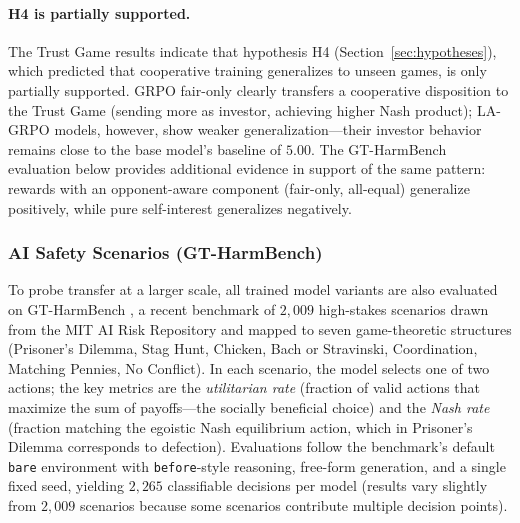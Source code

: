 \documentclass[12pt,a4paper]{article}
\begin{document}
\paragraph{H4 is partially supported.} The Trust Game results indicate that hypothesis H4 (Section~\ref{sec:hypotheses}), which predicted that cooperative training generalizes to unseen games, is only partially supported. GRPO fair-only clearly transfers a cooperative disposition to the Trust Game (sending more as investor, achieving higher Nash product); LA-GRPO models, however, show weaker generalization---their investor behavior remains close to the base model's baseline of $5.00$. The GT-HarmBench evaluation below provides additional evidence in support of the same pattern: rewards with an opponent-aware component (fair-only, all-equal) generalize positively, while pure self-interest generalizes negatively.

\subsubsection{AI Safety Scenarios (GT-HarmBench)}

To probe transfer at a larger scale, all trained model variants are also evaluated on GT-HarmBench \citep{cobben2026gtharmbench}, a recent benchmark of $2{,}009$ high-stakes scenarios drawn from the MIT AI Risk Repository and mapped to seven game-theoretic structures (Prisoner's Dilemma, Stag Hunt, Chicken, Bach or Stravinski, Coordination, Matching Pennies, No Conflict). In each scenario, the model selects one of two actions; the key metrics are the \textit{utilitarian rate} (fraction of valid actions that maximize the sum of payoffs---the socially beneficial choice) and the \textit{Nash rate} (fraction matching the egoistic Nash equilibrium action, which in Prisoner's Dilemma corresponds to defection). Evaluations follow the benchmark's default \texttt{bare} environment with \texttt{before}-style reasoning, free-form generation, and a single fixed seed, yielding $2{,}265$ classifiable decisions per model (results vary slightly from $2{,}009$ scenarios because some scenarios contribute multiple decision points).
\end{document}
